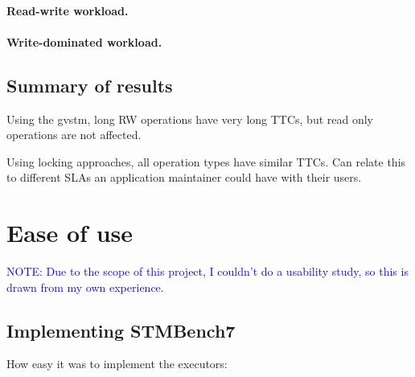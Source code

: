 \documentclass[12pt,a4paper,oneside,openright]{report}
\newcommand{\note}[1]{\textcolor{blue}{NOTE: #1}}
\begin{document}
\paragraph{Read-write workload.}
\label{sec:impl:read-write-workload}

\paragraph{Write-dominated workload.}
\label{sec:eval:write-domin-workl}


\subsection{Summary of results}
\label{sec:eval:summary-results}

Using the gvstm, long RW operations have very long TTCs, but read only
operations are not affected.

Using locking approaches, all operation types have similar TTCs. Can
relate this to different SLAs an application maintainer could have
with their users.

\section{Ease of use}
\label{sec:eval:ease-use}

\note{Due to the scope of this project, I couldn't do a usability
  study, so this is drawn from my own experience.}

\subsection{Implementing STMBench7}
\label{sec:eval:impl-stmb}

How easy it was to implement the executors:
\end{document}

